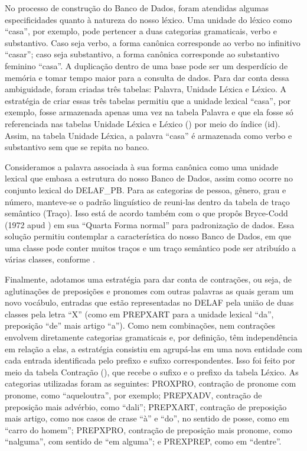 \documentclass[portuguese]{textolivre}
\begin{document}
No processo de construção do Banco de Dados, foram atendidas algumas especificidades quanto à natureza do nosso léxico. Uma unidade do léxico como “casa”, por exemplo, pode pertencer a duas categorias gramaticais, verbo e substantivo. Caso seja verbo, a forma canônica corresponde ao verbo no infinitivo “casar”; caso seja substantivo, a forma canônica corresponde ao substantivo feminino “casa”. A duplicação dentro de uma base pode ser um desperdício de memória e tomar tempo maior para a consulta de dados. Para dar conta dessa ambiguidade, foram criadas três tabelas: Palavra, Unidade Léxica e Léxico. A estratégia de criar essas três tabelas permitiu que a unidade lexical “casa”, por exemplo, fosse armazenada apenas uma vez na tabela Palavra e que ela fosse só referenciada nas tabelas Unidade Léxica e Léxico () por meio do índice (id). Assim, na tabela Unidade Léxica, a palavra “casa” é armazenada como verbo e substantivo sem que se repita no banco.

Consideramos a palavra associada à sua forma canônica como uma unidade lexical que embasa a estrutura do nosso Banco de Dados, assim como ocorre no conjunto lexical do DELAF\_PB. Para as categorias de pessoa, gênero, grau e número, manteve-se o padrão linguístico de reuni-las dentro da tabela de traço semântico (Traço). Isso está de acordo também com o que propôs Bryce-Codd (1972 apud \cite[p. 75]{lake_concise_2013}) 
em sua “Quarta Forma normal” para padronização de dados. Essa solução permitiu contemplar a característica do nosso Banco de Dados, em que uma classe pode conter muitos traços e um traço semântico pode ser atribuído a várias classes, conforme .

Finalmente, adotamos uma estratégia para dar conta de contrações, ou seja, de aglutinações de preposições e pronomes com outras palavras as quais geram um novo vocábulo, entradas que estão representadas no DELAF pela união de duas classes pela letra “X” (como em PREPXART para a unidade lexical “da”, preposição “de” mais artigo “a”). Como nem combinações, nem contrações envolvem diretamente categorias gramaticais e, por definição, têm independência em relação a elas, a estratégia consistiu em agrupá-las em uma nova entidade com cada entrada identificada pelo prefixo e sufixo correspondentes. Isso foi feito por meio da tabela Contração (), que recebe o sufixo e o prefixo da tabela Léxico. As categorias utilizadas foram as seguintes: PROXPRO, contração de pronome com pronome, como “aqueloutra”, por exemplo; PREPXADV, contração de preposição mais advérbio, como “dali”; PREPXART, contração de preposição mais artigo, como nos casos de crase “à” e “do”, no sentido de posse, como em “carro do homem”; PREPXPRO, contração de preposição mais pronome, como “nalguma”, com sentido de “em alguma”; e PREXPREP, como em “dentre”.
\end{document}
